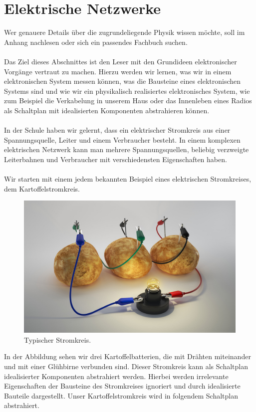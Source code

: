 \documentclass[11pt,a4paper,leqno]{report}
\numberwithin{equation}{chapter}
\begin{document}
\section{Elektrische Netzwerke}
Wer genauere Details \"uber die zugrundeliegende Physik wissen m\"ochte, soll im Anhang nachlesen oder sich ein passendes Fachbuch suchen.\\
\\
Das Ziel dieses Abschnittes ist den Leser mit den Grundideen elektronischer Vorg\"ange vertraut zu machen. Hierzu werden wir lernen, was wir in einem elektronischen System messen k\"onnen, was die Bausteine eines elektronischen Systems sind und wie wir ein physikalisch realisiertes elektronisches System, wie zum Beispiel die Verkabelung in unserem Haus oder das Innenleben eines Radios als Schaltplan mit idealisierten Komponenten abstrahieren k\"onnen.\\
\\
In der Schule haben wir gelernt, dass ein elektrischer Stromkreis aus einer Spannungsquelle, Leiter und einem Verbraucher besteht.
In einem komplexen elektrischen Netzwerk kann man mehrere Spannungsquellen, beliebig verzweigte Leiterbahnen und Verbraucher mit verschiedensten Eigenschaften haben.
\\
\\
Wir starten mit einem jedem bekannten Beispiel eines elektrischen Stromkreises, dem Kartoffelstromkreis.
\begin{figure}[H]
	\begin{center}
		\includegraphics[scale=0.5]{Bilder/kartoffel.jpg}
		\caption{Typischer Stromkreis.}
	\end{center}
\end{figure}
\noindent
In der Abbildung sehen wir drei Kartoffelbatterien, die mit Dr\"ahten miteinander und mit einer Gl\"uhbirne verbunden sind. Dieser Stromkreis kann als Schaltplan idealisierter Komponenten abstrahiert werden. Hierbei werden irrelevante Eigenschaften der Bausteine des Stromkreises ignoriert und durch idealisierte Bauteile dargestellt. Unser Kartoffelstromkreis wird in folgendem Schaltplan abstrahiert.
\end{document}
